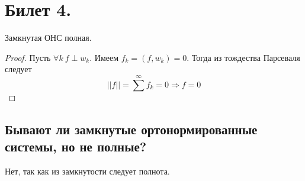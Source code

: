 \section{Билет 4.}

\begin{theorem}
    Замкнутая ОНС полная.
    \begin{proof}
        Пусть $\forall k \> f \perp w_k$. Имеем $f_k  = (f, w_k) = 0$. Тогда из тождества Парсеваля следует
        \[
            ||f|| = \sum^{\infty} f_k = 0 \Rightarrow f = 0
        \]
        \end{proof}
\end{theorem}

\subsection{Бывают ли замкнутые ортонормированные системы, но не полные?}
Нет, так как из замкнутости следует полнота.